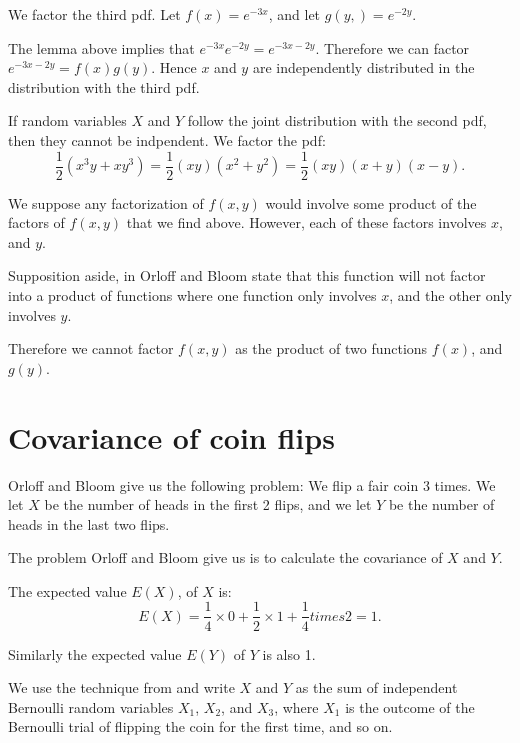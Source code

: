 \documentclass[a4paper,11pt]{article}
\begin{document}
We factor the third pdf. Let $f\left(x \right)=e^{-3x}$, and let
$g\left(y, \right) = e^{-2y}$.

The lemma above implies that $e^{-3x} e^{-2y}=e^{-3x-2y}$.  Therefore we can
factor $e^{-3x-2y}=f\left(x \right) g\left(y \right)$.  Hence $x$ and $y$ are
independently distributed in the distribution with the third pdf.

If random variables $X$ and $Y$ follow the joint distribution with the second
pdf, then they cannot be indpendent. We factor the pdf:
\begin{equation}
  \frac{1}{2}\left(x^3y + xy^3 \right) = \frac{1}{2}\left(xy \right)\left(x^2 + y^2 \right)
  = \frac{1}{2}\left(xy \right)\left(x +y \right)\left( x - y \right).
\end{equation}


We suppose any factorization of $f\left(x, y\right)$ would involve
some product of the factors of $f\left(x, y\right)$ that
we find above.  However, each of these factors involves
$x$, and $y$.

Supposition aside, in \cite{reading7} Orloff and Bloom state that this
function will not factor into a product of functions where one function
only involves $x$, and the other only involves $y$.

Therefore we cannot factor $f\left( x, y \right)$ as
the product of two functions $f\left(x \right)$, and
$g\left(y \right)$.

\section{Covariance of coin flips}

Orloff and Bloom give us the following problem:
We flip a fair coin 3 times.  We let $X$ be the
number of heads in the first 2 flips, and we
let $Y$ be the number of heads in the last two flips.

The problem Orloff and Bloom give us is to calculate
the covariance of $X$ and $Y$.

The expected value $E\left( X \right)$, of $X$
is:
\begin{equation}
E\left(X \right)  =
  \frac{1}{4}\times 0 + \frac{1}{2} \times 1 + \frac{1}{4} times 2 = 1.
\end{equation}

Similarly the expected value $E\left( Y \right)$ of $Y$ is also 1.

We use the technique from \cite{reading7b} and write $X$ and $Y$
as the sum of independent Bernoulli random variables
$X_1$, $X_2$, and $X_3$, where $X_1$ is the outcome
of the Bernoulli trial of flipping the coin for the
first time, and so on.
\end{document}
